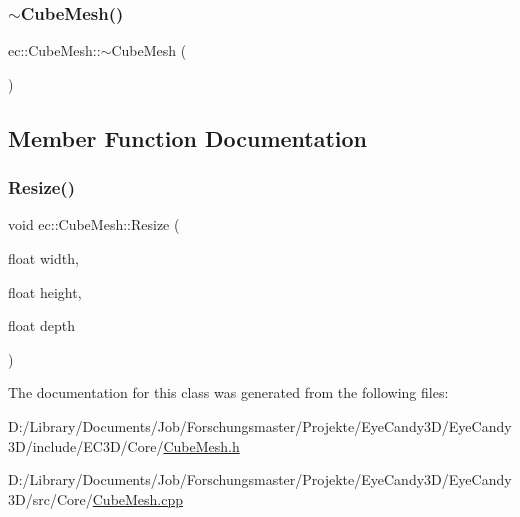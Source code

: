 \subsubsection{\texorpdfstring{$\sim$\+Cube\+Mesh()}{~CubeMesh()}}
{\footnotesize\ttfamily ec\+::\+Cube\+Mesh\+::$\sim$\+Cube\+Mesh (\begin{DoxyParamCaption}{ }\end{DoxyParamCaption})}



\subsection{Member Function Documentation}
\mbox{\label{classec_1_1_cube_mesh_a4c2538e7fa1de0ea96c794ae3bc6e1d7}} 
\subsubsection{\texorpdfstring{Resize()}{Resize()}}
{\footnotesize\ttfamily void ec\+::\+Cube\+Mesh\+::\+Resize (\begin{DoxyParamCaption}\item[{float}]{width,  }\item[{float}]{height,  }\item[{float}]{depth }\end{DoxyParamCaption})}



The documentation for this class was generated from the following files\+:\begin{DoxyCompactItemize}
\item 
D\+:/\+Library/\+Documents/\+Job/\+Forschungsmaster/\+Projekte/\+Eye\+Candy3\+D/\+Eye\+Candy3\+D/include/\+E\+C3\+D/\+Core/\mbox{\hyperlink{_cube_mesh_8h}{Cube\+Mesh.\+h}}\item 
D\+:/\+Library/\+Documents/\+Job/\+Forschungsmaster/\+Projekte/\+Eye\+Candy3\+D/\+Eye\+Candy3\+D/src/\+Core/\mbox{\hyperlink{_cube_mesh_8cpp}{Cube\+Mesh.\+cpp}}\end{DoxyCompactItemize}
